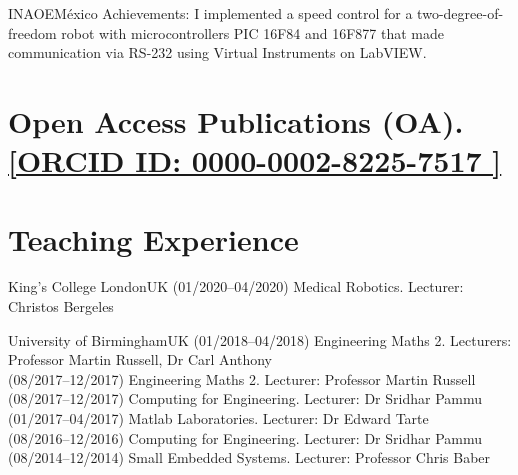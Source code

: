 \documentclass[10pt,a4paper,roman]{moderncv}
\begin{document}
{INAOE}{M\'exico}{}
{Achievements:
I implemented a speed control for a two-degree-of-freedom robot with microcontrollers
PIC 16F84 and 16F877 that made communication via RS-232 using Virtual Instruments on LabVIEW.
}


\vspace{20mm}


\section{Open Access Publications (OA).
	\href{http://orcid.org/0000-0002-8225-7517}{ [ORCID ID: 0000-0002-8225-7517 \faExternalLink]}
	}




\section{Teaching Experience}

{King's College London}{UK}{}
{
(01/2020--04/2020) Medical Robotics. Lecturer: Christos Bergeles
}



{University of Birmingham}{UK}{}
{
(01/2018--04/2018) Engineering Maths 2. Lecturers: Professor Martin Russell, Dr Carl Anthony \\
(08/2017--12/2017) Engineering Maths 2. Lecturer: Professor Martin Russell \\
(08/2017--12/2017) Computing for Engineering. Lecturer: Dr Sridhar Pammu \\
(01/2017--04/2017) Matlab Laboratories. Lecturer: Dr Edward Tarte \\
(08/2016--12/2016) Computing for Engineering. Lecturer: Dr Sridhar Pammu \\
(08/2014--12/2014) Small Embedded Systems. Lecturer: Professor Chris Baber
}
\end{document}
